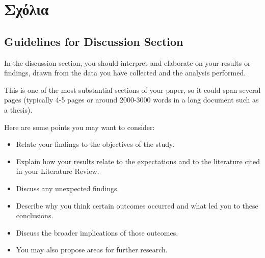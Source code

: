\chapter{Σχόλια}

\section*{Guidelines for Discussion Section}
In the discussion section, you should interpret and elaborate on your results or findings, drawn from the data you have collected and the analysis performed. 

This is one of the most substantial sections of your paper, so it could span several pages (typically 4-5 pages or around 2000-3000 words in a long document such as a thesis). 

Here are some points you may want to consider:
\begin{itemize}
    \item Relate your findings to the objectives of the study.
    \item Explain how your results relate to the expectations and to the literature cited in your Literature Review.
    \item Discuss any unexpected findings.
    \item Describe why you think certain outcomes occurred and what led you to these conclusions.
    \item Discuss the broader implications of those outcomes.
    \item You may also propose areas for further research.
\end{itemize}

